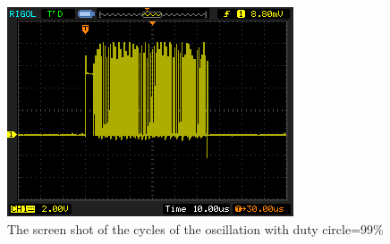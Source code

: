 \documentclass[11pt]{article}
\begin{document}
\begin{figure}[H]
 \begin{center}
  \includegraphics[width=\linewidth/2]{act5_2b}
  \caption{The screen shot of the cycles of the oscillation with duty circle=99\%}
  \label{fig:act5_2b}
 \end{center}
\end{figure}
\end{document}
